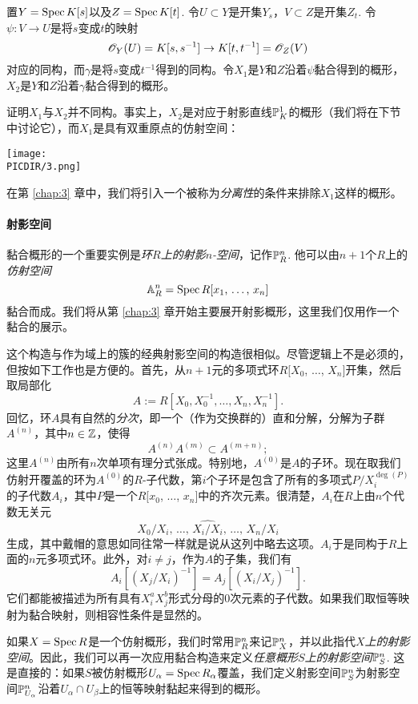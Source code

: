 \begin{exe}\label{exe:1.44}
置$Y=\spec K[s]$以及$Z=\spec K[t]$. 令$U\subset Y$是开集$Y_s$，$V\subset Z$是开集$Z_t$. 令$\psi:V\to U$是将$s$变成$t$的映射
\[
	\oo_Y(U)=K[s,s^{-1}]\to K[t,t^{-1}]=\oo_Z(V)
\]
对应的同构，而$\gamma$是将$s$变成$t^{-1}$得到的同构。令$X_1$是$Y$和$Z$沿着$\psi$黏合得到的概形，$X_2$是$Y$和$Z$沿着$\gamma$黏合得到的概形。

证明$X_1$与$X_2$并不同构。事实上，$X_2$是对应于射影直线$\P_K^1$的概形（我们将在下节中讨论它），而$X_1$是具有双重原点的仿射空间：

\begin{center}\texttt{[image: \\PICDIR/3.png]}\end{center}

在第 \ref{chap:3} 章中，我们将引入一个被称为\textit{分离性}的条件来排除$X_1$这样的概形。
\end{exe}

\paragraph*{射影空间}
黏合概形的一个重要实例是\textit{环$R$上的射影$n$-空间}，记作$\P^n_R$. 他可以由$n+1$个$R$上的\textit{仿射空间}
\[
	\A_R^n=\spec R[\text{$x_1$, $\dots$, $x_n$}]
\]
黏合而成。我们将从第 \ref{chap:3} 章开始主要展开射影概形，这里我们仅用作一个黏合的展示。

这个构造与作为域上的簇的经典射影空间的构造很相似。尽管逻辑上不是必须的，但按如下工作也是方便的。首先，从$n+1$元的多项式环$R[X_0$, $\dots$, $X_n]$开集，然后取局部化
\[
	A:=R[X_0,X_0^{-1},\dots,X_n,X_n^{-1}].
\]
回忆，环$A$具有自然的\textit{分次}，即一个（作为交换群的）直和分解，分解为子群$A^{(n)}$，其中$n\in \zz$，使得
\[
	A^{(n)}A^{(m)}\subset A^{(m+n)};
\]
这里$A^{(n)}$由所有$n$次单项有理分式张成。特别地，$A^{(0)}$是$A$的子环。现在取我们仿射开覆盖的环为$A^{(0)}$的$R$-子代数，第$i$个子环是包含了所有的多项式$P/X_i^{\deg(P)}$的子代数$A_i$，其中$P$是一个$R[x_0$, $\dots$, $x_n]$中的齐次元素。很清楚，$A_i$在$R$上由$n$个代数无关元
\[
	X_0/X_i,\,\dots,\,\widehat{X_i/X_i},\,\dots,\,X_n/X_i
\]
生成，其中戴帽的意思如同往常一样就是说从这列中略去这项。$A_i$于是同构于$R$上面的$n$元多项式环。此外，对$i\neq j$，作为$A$的子集，我们有
\[
	A_i[(X_j/X_i)^{-1}]=A_j[(X_i/X_j)^{-1}].
\]
它们都能被描述为所有具有$X_i^aX_j^b$形式分母的$0$次元素的子代数。如果我们取恒等映射为黏合映射，则相容性条件是显然的。

如果$X=\spec R$是一个仿射概形，我们时常用$\P^n_R$来记$\P^n_X$，并以此指代\textit{$X$上的射影空间}。因此，我们可以再一次应用黏合构造来定义\textit{任意概形$S$上的射影空间$\P_S^n$}. 这是直接的：如果$S$被仿射概形$U_\alpha=\spec R_\alpha$覆盖，我们定义射影空间$\P_S^n$为射影空间$\P_{U_\alpha}^n$沿着$U_\alpha\cap U_\beta$上的恒等映射黏起来得到的概形。
